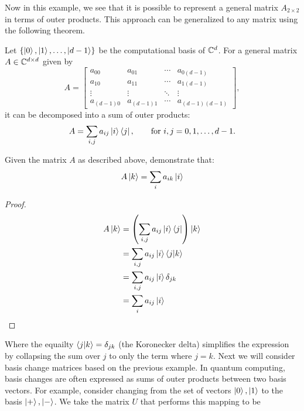 \documentclass[12pt]{article}
\begin{document}
Now in this example, we see that it is possible to represent a general matrix $A_{2 \times 2}$ in terms of outer products. This approach can be generalized to any matrix using the following theorem. 

\begin{theorem}
    Let $\{\ket{0}, \ket{1}, \ldots, \ket{d-1}\}$ be the computational basis of $\mathbb{C}^{d}$. For a general matrix $A \in \mathbb{C}^{d \times d}$ given by
    \[
        A =
        \begin{bmatrix}
        a_{00}     & a_{01}     & \cdots & a_{0(d-1)} \\
        a_{10}     & a_{11}     & \cdots & a_{1(d-1)} \\
        \vdots     & \vdots     & \ddots & \vdots     \\
        a_{(d-1)0} & a_{(d-1)1} & \cdots & a_{(d-1)(d-1)}
        \end{bmatrix},
    \]
    it can be decomposed into a sum of outer products:
    \[
        A = \sum_{i,j} a_{ij} \ket{i}\bra{j},
        \qquad \text{for } i,j = 0,1,\ldots,d-1.
    \]
\end{theorem}

\begin{example}
    Given the matrix $A$ as described above, demonstrate that:
    $$A \ket{k} = \sum_i a_{ik} \ket{i}$$
\end{example}

\begin{proof}
    \begin{align*}
        A \ket{k} &= \left(\sum_{i, j} a_{ij} \ket{i} \bra{j}\right) \ket{k} \\
        &= \sum_{i, j} a_{ij} \ket{i} \braket{j}{k} \\
        &= \sum_{i, j} a_{ij} \ket{i} \delta_{jk} \\ 
        &= \sum_{i} a_{ij} \ket{i}
    \end{align*}
\end{proof}

Where the equailty $\braket{j}{k} = \delta_{jk}$ (the Koronecker delta) simplifies the expression by collapsing the sum over $j$ to only the term where $j = k$. Next we will consider basis change matrices based on the previous example. In quantum computing, basis changes are often expressed as sums of outer products between two basis vectors. For example, consider changing from the set of vectors ${\ket{0}, \ket{1}}$ to the basis ${\ket{+}, \ket{-}}$. We take the matrix $U$ that performs this mapping to be 
\end{document}
